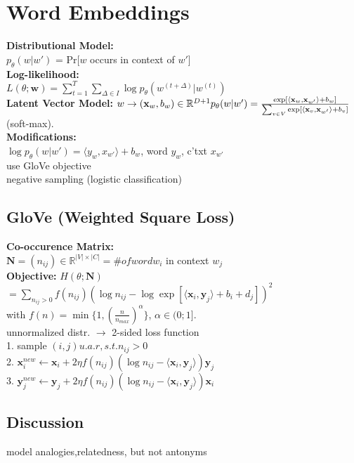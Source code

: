 \section{Word Embeddings}
\textbf{Distributional Model:}\\
$p_\theta(w|w')$ = Pr[$w$ occurs in context of $w'$]\\
\textbf{Log-likelihood:}\\
$L(\theta; \mathbf{w}) = \sum_{t=1}^T\sum_{\Delta \in I}{\log p_\theta(w^{(t+\Delta)}|w^{(t)})}$\\
\textbf{Latent Vector Model:} $w \rightarrow (\mathbf{x}_w, b_w) \in \mathbb{R}^{D+1} \\p_{\theta}(w|w') = \frac{\exp[\langle \mathbf{x}_w,\mathbf{x}_{w'}\rangle + b_w]}{\sum_{v\in V}{\exp[\langle \mathbf{x}_v,\mathbf{x}_{w'}\rangle + b_v ]}}$ (soft-max).\\
\textbf{Modifications:}\\
$\log p_{\theta}(w|w') = \langle  y_{w} , x_{w'} \rangle + b_w$,  word $y_w$, c'txt $x_{w'}$\\
use GloVe objective\\
negative sampling (logistic classification)

\subsection*{GloVe (Weighted Square Loss)}
\textbf{Co-occurence Matrix:}\\
$\mathbf{N} = (n_{ij}) \in \mathbb{R}^{|V|\times|C|} = \# of word w_i$ in context $w_j$\\
\textbf{Objective:} $H(\theta;\mathbf{N})$\\
$= \sum_{n_{ij} > 0} f(n_{ij})(\log n_{ij} - \log \exp[\langle \mathbf{x}_i, \mathbf{y}_j \rangle + b_i + d_j])^2$\\
with $f(n) = \min\{1, (\frac{n}{n_{max}})^\alpha\}$, $\alpha \in (0;1]$.\\
unnormalized distr. $\rightarrow$ 2-sided loss function\\
1. sample $(i,j) u.a.r, s.t. n_{ij}>0$\\
2. $\mathbf{x}_i^{new} \leftarrow \mathbf{x}_i + 2\eta f(n_{ij})(\log n_{ij} - \langle \mathbf{x}_i, \mathbf{y}_j \rangle)\mathbf{y}_j$\\
3. $\mathbf{y}_j^{new} \leftarrow \mathbf{y}_j + 2\eta f(n_{ij})(\log n_{ij} - \langle \mathbf{x}_i, \mathbf{y}_j \rangle)\mathbf{x}_i$

\subsection*{Discussion}
model analogies,relatedness, but not antonyms 

